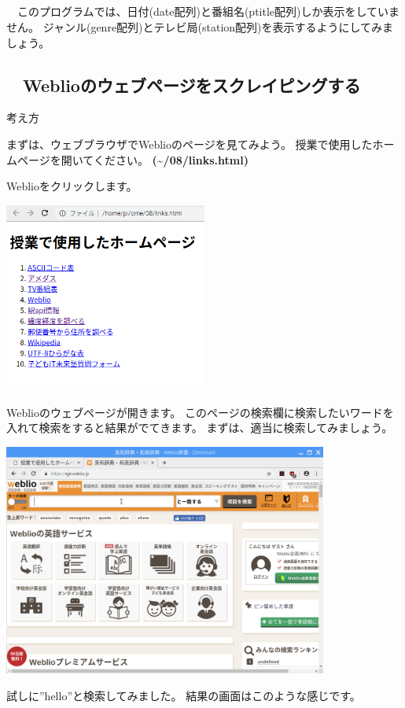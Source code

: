 \subsection*{\theQuestion}
\ \ このプログラムでは、日付(date配列)と番組名(ptitle配列)しか表示をしていません。
ジャンル(genre配列)とテレビ局(station配列)を表示するようにしてみましょう。

\clearpage\subsection*{\theExercise　Weblioのウェブページをスクレイピングする}
\addtocounter{Exercise}{-1}\label{E:Weblio}
考え方

まずは、ウェブブラウザでWeblioのページを見てみよう。
授業で使用したホームページを開いてください。
\textbf{({\textasciitilde}/08/links.html)}

Weblioをクリックします。



\begin{center}
\includegraphics[width=0.5\textwidth]{./text08-img/textbook-img017.png}

\end{center}


Weblioのウェブページが開きます。
このページの検索欄に検索したいワードを入れて検索をすると結果がでてきます。
まずは、適当に検索してみましょう。



\begin{center}
\includegraphics[width=0.8\textwidth]{./text08-img/textbook-img045.png}

\end{center}
\clearpage
試しに”hello”と検索してみました。
結果の画面はこのような感じです。



